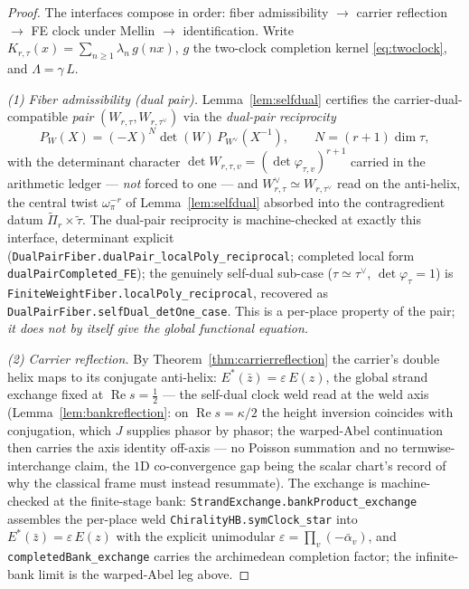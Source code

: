 \documentclass[11pt]{article}
\theoremstyle{definition}
\renewcommand{\Re}{\operatorname{Re}}
\begin{document}
\begin{proof}
The interfaces compose in order: fiber admissibility $\to$ carrier reflection $\to$ FE clock under Mellin
$\to$ identification. Write $K_{r,\tau}(x)=\sum_{n\ge1}\lambda_n\,g(nx)$, $g$ the two-clock completion
kernel \eqref{eq:twoclock}, and $\Lambda=\gamma\,L$.

\emph{(1) Fiber admissibility (dual pair).} Lemma~\ref{lem:selfdual} certifies the carrier-dual-compatible
\emph{pair} $(W_{r,\tau},W_{r,\tau^\vee})$ via the \emph{dual-pair reciprocity}
\[
  P_{W}(X)=(-X)^{N}\det(W)\,P_{W^\vee}(X^{-1}),\qquad N=(r+1)\dim\tau,
\]
with the determinant character $\det W_{r,\tau,v}=(\det\varphi_{\tau,v})^{r+1}$ carried in the arithmetic
ledger --- \emph{not} forced to one --- and $W_{r,\tau}^\vee\simeq W_{r,\tau^\vee}$ read on the anti-helix, the central twist $\omega_\pi^{-r}$ of Lemma~\ref{lem:selfdual} absorbed into the contragredient datum $\widetilde\Pi_r\times\widetilde\tau$.
The dual-pair reciprocity is machine-checked at exactly this interface, determinant explicit
(\texttt{DualPairFiber.dualPair\_localPoly\_reciprocal}; completed local form
\texttt{dualPairCompleted\_FE}); the genuinely self-dual sub-case ($\tau\simeq\tau^\vee$,
$\det\varphi_\tau=1$) is \texttt{FiniteWeightFiber.localPoly\_reciprocal}, recovered as
\texttt{DualPairFiber.selfDual\_detOne\_case}. This is a per-place property of the pair; \emph{it does not by
itself give the global functional equation.}

\emph{(2) Carrier reflection.} By Theorem~\ref{thm:carrierreflection} the carrier's double helix maps to its
conjugate anti-helix: $E^{*}(\bar z)=\varepsilon\,E(z)$, the global strand exchange fixed at $\Re s=\tfrac12$
--- the self-dual clock weld read at the weld axis (Lemma~\ref{lem:bankreflection}: on $\Re s=\kappa/2$ the height inversion coincides with conjugation, which $J$ supplies phasor by phasor; the warped-Abel continuation then carries the axis identity off-axis --- no Poisson summation and no termwise-interchange claim, the $1$D co-convergence gap being the scalar chart's record of why the classical frame must instead resummate).
The exchange is machine-checked at the finite-stage bank:
\texttt{StrandExchange.bankProduct\_exchange} assembles the per-place weld
\texttt{ChiralityHB.symClock\_star} into $E^{*}(\bar z)=\varepsilon\,E(z)$ with the explicit
unimodular $\varepsilon=\prod_v(-\bar\alpha_v)$, and \texttt{completedBank\_exchange} carries the
archimedean completion factor; the infinite-bank limit is the warped-Abel leg above.


\end{proof}
\end{document}
